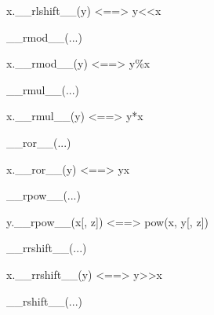 \documentclass[letterpaper,10pt,english]{sphinxmanual}
\begin{document}
\begin{description}
\begin{description}
\begin{DUlineblock}{0em}
\item[]
\begin{DUlineblock}{\DUlineblockindent}
\item[] x.\_\_rlshift\_\_(y) \textless{}==\textgreater{} y\textless{}\textless{}x
\item[] 
\end{DUlineblock}
\item[] \_\_rmod\_\_(...)
\item[]
\begin{DUlineblock}{\DUlineblockindent}
\item[] x.\_\_rmod\_\_(y) \textless{}==\textgreater{} y\%x
\item[] 
\end{DUlineblock}
\item[] \_\_rmul\_\_(...)
\item[]
\begin{DUlineblock}{\DUlineblockindent}
\item[] x.\_\_rmul\_\_(y) \textless{}==\textgreater{} y*x
\item[] 
\end{DUlineblock}
\item[] \_\_ror\_\_(...)
\item[]
\begin{DUlineblock}{\DUlineblockindent}
\item[] x.\_\_ror\_\_(y) \textless{}==\textgreater{} y\textbar{}x
\item[] 
\end{DUlineblock}
\item[] \_\_rpow\_\_(...)
\item[]
\begin{DUlineblock}{\DUlineblockindent}
\item[] y.\_\_rpow\_\_(x{[}, z{]}) \textless{}==\textgreater{} pow(x, y{[}, z{]})
\item[] 
\end{DUlineblock}
\item[] \_\_rrshift\_\_(...)
\item[]
\begin{DUlineblock}{\DUlineblockindent}
\item[] x.\_\_rrshift\_\_(y) \textless{}==\textgreater{} y\textgreater{}\textgreater{}x
\item[] 
\end{DUlineblock}
\item[] \_\_rshift\_\_(...)
\item[]
\begin{DUlineblock}{\DUlineblockindent}

\end{DUlineblock}
\end{DUlineblock}
\end{description}
\end{description}
\end{document}
